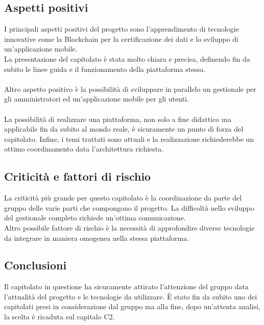 \subsection{Aspetti positivi}
I principali aspetti positivi del progetto sono l'apprendimento di tecnologie innovative come la Blockchain per la certificazione dei dati e lo sviluppo di un'applicazione mobile.\\
La presentazione del capitolato è stata molto chiara e precisa, definendo fin da subito le linee guida e il funzionamento della piattaforma stessa. \\\\
Altro aspetto positivo è la possibilità di sviluppare in parallelo un gestionale per gli amministratori ed un'applicazione mobile per gli utenti.\\\\
La possibilità di realizzare una piattaforma, non solo a fine didattico ma applicabile fin da subito al mondo reale, è sicuramente un punto di forza del capitolato. Infine, i temi trattati sono attuali e la realizzazione richiederebbe un ottimo coordinamento data l'architettura richiesta.

\subsection{Criticità e fattori di rischio}
La criticità più grande per questo capitolato è la coordinazione da parte del gruppo delle varie parti che compongono il progetto. La difficoltà nello sviluppo del gestionale completo richiede un'ottima comunicazione. \\
Altro possibile fattore di rischio è la necessità di approfondire diverse tecnologie da integrare in maniera omogenea nella stessa piattaforma.

\subsection{Conclusioni}
Il capitolato in questione ha sicuramente attirato l'attenzione del gruppo data l'attualità del progetto e le tecnologie da utilizzare. È stato fin da subito uno dei capitolati presi in considerazione dal gruppo ma alla fine, dopo un'attenta analisi, la scelta è ricaduta sul capitalo C2. 

\newpage